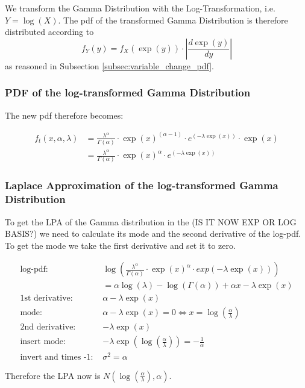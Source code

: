 \documentclass{article}
\begin{document}
We transform the Gamma Distribution with the Log-Transformation, i.e. $Y = \log(X)$. The pdf of the transformed Gamma Distribution is therefore distributed according to
$$f_Y(y) = f_X(\exp(y)) \cdot \left | \frac{d \exp(y)}{dy} \right|$$
as reasoned in Subsection \ref{subsec:variable_change_pdf}.

\subsubsection{PDF of the log-transformed Gamma Distribution}

The new pdf therefore becomes:

\begin{align}
f_t(x, \alpha, \lambda) &= \frac{\lambda^\alpha}{\Gamma(\alpha)} \cdot \exp(x)^{(\alpha - 1)} \cdot e^{(-\lambda \exp(x))} \cdot \exp(x) \\
&=\frac{\lambda^\alpha}{\Gamma(\alpha)} \cdot \exp(x)^{\alpha} \cdot e^{(-\lambda \exp(x))}
\end{align}

\subsubsection{Laplace Approximation of the log-transformed Gamma Distribution}

To get the LPA of the Gamma distribution in the (IS IT NOW EXP OR LOG BASIS?) we need to calculate its mode and the second derivative of the log-pdf. To get the mode we take the first derivative and set it to zero. 

\begin{align*}
\text{log-pdf: } &\log\left(\frac{\lambda^\alpha}{\Gamma(\alpha)} \cdot \exp(x)^{\alpha} \cdot exp(-\lambda \exp(x)) \right) \\
&= \alpha \log(\lambda) - \log(\Gamma(\alpha)) + \alpha x - \lambda \exp(x)\\
\text{1st derivative: }&  \alpha - \lambda \exp(x)\\
\text{mode: }& \alpha - \lambda \exp(x) = 0 \Leftrightarrow x = \log\left(\frac{\alpha}{\lambda}\right)\\
\text{2nd derivative: }&  -\lambda \exp(x)\\
\text{insert mode: }& -\lambda \exp(\log\left(\frac{\alpha}{\lambda}\right)) = -\frac{1}{\alpha} \\
\text{invert and times -1: }&\sigma^2 = \alpha 
\end{align*}

Therefore the LPA now is $N(\log\left(\frac{\alpha}{\lambda}\right), \alpha)$.
\end{document}

